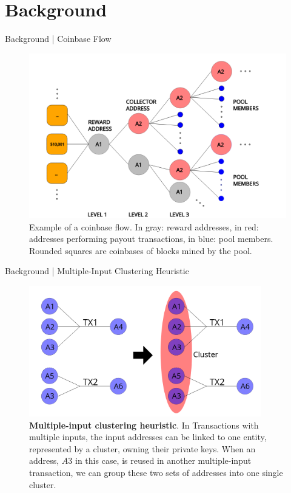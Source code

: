 \documentclass[10pt]{beamer}
\begin{document}
\section{Background} 
\begin{frame}[fragile]{Background | Coinbase Flow}
    \begin{figure}
        \includegraphics[width=.8\textwidth]{images/flow_BTCcom_example1.png}
        \caption{Example of a coinbase flow. In gray: reward addresses, in red: addresses performing payout transactions, in blue: pool members. Rounded squares are coinbases of blocks mined by the pool.}
        \label{fig:btccom_flow}
    \end{figure}
\end{frame}

\begin{frame}[fragile]{Background | Multiple-Input Clustering Heuristic}
    \begin{figure}
        \centering
        \includegraphics[width=0.9\textwidth]{images/clustering.png}
        \caption{\textbf{Multiple-input clustering heuristic}. In Transactions with multiple inputs, the input addresses can be linked to one entity, represented by a cluster, owning their private keys. When an address, $A3$ in this case, is reused in another multiple-input transaction, we can group these two sets of addresses into one single cluster.}
        \label{fig:clustering}
    \end{figure}
\end{frame}
\end{document}
